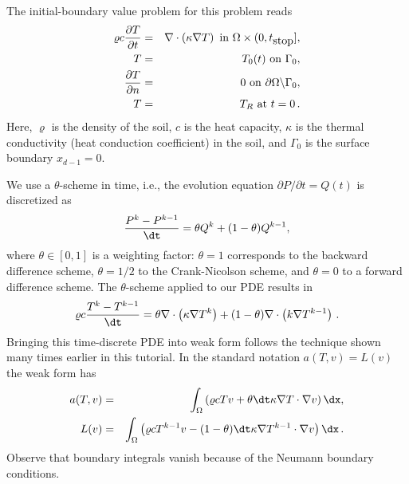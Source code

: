The initial-boundary value problem for this problem reads
\begin{eqnarray}
\varrho c{\partial T\over\partial t} &=& \nabla\cdot\left( \kappa\nabla T\right)\hbox{ in }\Omega\times (0,t_{\hbox{stop}}],\\
T &=& T_0(t)\hbox{ on }\Gamma_0,\\
{\partial T\over\partial n} &=& 0\hbox{ on }\partial\Omega\backslash\Gamma_0,\\
T &=& T_R\hbox{ at }t =0\thinspace .
\end{eqnarray}
Here, $\varrho$ is the density of the soil, $c$ is the
heat capacity, $\kappa$ is the thermal conductivity 
(heat conduction coefficient)
in the soil, and $\Gamma_0$ is the surface boundary $x_{d-1}=0$.

We use a $\theta$-scheme in time, i.e., the evolution equation
$\partial P/\partial t=Q(t)$ is discretized as
\[ {P^k - P^{k-1}\over{\dt}} = \theta Q^k + (1-\theta )Q^{k-1},\]
where $\theta\in[0,1]$ is a weighting factor: $\theta =1$ corresponds
to the backward difference scheme, $\theta =1/2$ to the Crank-Nicolson
scheme, and $\theta =0$ to a forward difference scheme.
The $\theta$-scheme applied to our PDE results in
\[
\varrho c{T^k-T^{k-1}\over{\dt}} =
\theta \nabla\cdot\left( \kappa\nabla T^k\right)
+ (1-\theta) \nabla\cdot\left( k\nabla T^{k-1}\right)\langtangenep
\]
Bringing this time-discrete PDE into weak form follows the technique shown
many times earlier in this tutorial. In the standard notation
$a(T,v)=L(v)$ the weak form has
\begin{eqnarray}
a(T,v) &=& \int_\Omega
\left( \varrho c Tv + \theta{\dt} \kappa\nabla T\cdot \nabla v\right)\dx,\\
L(v) &=& \int_\Omega \left( \varrho c T^{k-1}v - (1-\theta){\dt}
\kappa\nabla T^{k-1}\cdot \nabla v\right)\dx\langtangenep
\end{eqnarray}
Observe that boundary integrals vanish because of the Neumann boundary
conditions.

